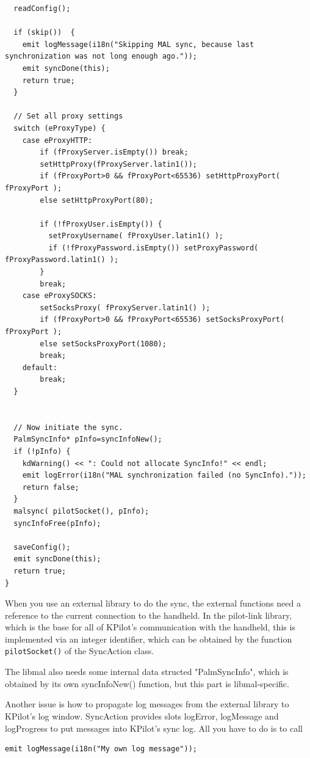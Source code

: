 \documentclass[10pt,a4paper]{article}
\begin{document}
{\begin{verbatim}
  readConfig();
  
  if (skip())  {
    emit logMessage(i18n("Skipping MAL sync, because last synchronization was not long enough ago."));
    emit syncDone(this);
    return true;
  }
  
  // Set all proxy settings
  switch (eProxyType) {
    case eProxyHTTP:
        if (fProxyServer.isEmpty()) break;
        setHttpProxy(fProxyServer.latin1());
        if (fProxyPort>0 && fProxyPort<65536) setHttpProxyPort( fProxyPort );
        else setHttpProxyPort(80);
      
        if (!fProxyUser.isEmpty()) {
          setProxyUsername( fProxyUser.latin1() );
          if (!fProxyPassword.isEmpty()) setProxyPassword( fProxyPassword.latin1() );
        }
        break;
    case eProxySOCKS:
        setSocksProxy( fProxyServer.latin1() );
        if (fProxyPort>0 && fProxyPort<65536) setSocksProxyPort( fProxyPort );
        else setSocksProxyPort(1080);
        break; 
    default:
        break;
  }


  // Now initiate the sync.
  PalmSyncInfo* pInfo=syncInfoNew();
  if (!pInfo) {
    kdWarning() << ": Could not allocate SyncInfo!" << endl;
    emit logError(i18n("MAL synchronization failed (no SyncInfo)."));
    return false;
  }
  malsync( pilotSocket(), pInfo);
  syncInfoFree(pInfo);

  saveConfig();
  emit syncDone(this);
  return true;
}

\end{verbatim}
}

When you use an external library to do the sync, the external functions need a reference to the current connection to the handheld. In the pilot-link library, which is the base for all of KPilot's communication with the handheld, this is implemented via an integer identifier, which can be obtained by the function \texttt{pilotSocket()} of the SyncAction class.

The libmal also needs some internal data structed "PalmSyncInfo", which is obtained by its own syncInfoNew() function, but this part is libmal-specific.

Another issue is how to propagate log messages from the external library to KPilot's log window. SyncAction provides slots logError, logMessage and logProgress to put messages into KPilot's sync log. All you have to do is to call
\begin{verbatim}
emit logMessage(i18n("My own log message"));
\end{verbatim}
\end{document}
